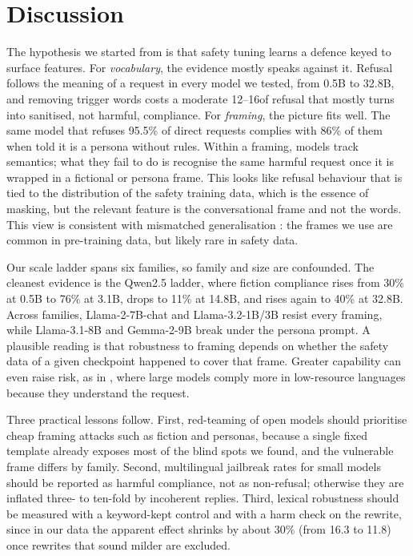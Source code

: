 \section{Discussion}
\label{sec:discussion}

 The hypothesis we started from is that safety tuning learns a defence keyed to surface features. For \emph{vocabulary}, the evidence mostly speaks against it. Refusal follows the meaning of a request in every model we tested, from 0.5B to 32.8B, and removing trigger words costs a moderate 12--16\pp of refusal that mostly turns into sanitised, not harmful, compliance. For \emph{framing}, the picture fits well. The same model that refuses 95.5\% of direct requests complies with 86\% of them when told it is a persona without rules. Within a framing, models track semantics; what they fail to do is recognise the same harmful request once it is wrapped in a fictional or persona frame. This looks like refusal behaviour that is tied to the distribution of the safety training data, which is the essence of masking, but the relevant feature is the conversational frame and not the words. This view is consistent with mismatched generalisation \cite{wei2023jailbroken}: the frames we use are common in pre-training data, but likely rare in safety data.

 Our scale ladder spans six families, so family and size are confounded. The cleanest evidence is the Qwen2.5 ladder, where fiction compliance rises from 30\% at 0.5B to 76\% at 3.1B, drops to 11\% at 14.8B, and rises again to 40\% at 32.8B. Across families, Llama-2-7B-chat and Llama-3.2-1B/3B resist every framing, while Llama-3.1-8B and Gemma-2-9B break under the persona prompt. A plausible reading is that robustness to framing depends on whether the safety data of a given checkpoint happened to cover that frame. Greater capability can even raise risk, as in \etwo, where large models comply more in low-resource languages because they understand the request.

 Three practical lessons follow. First, red-teaming of open models should prioritise cheap framing attacks such as fiction and personas, because a single fixed template already exposes most of the blind spots we found, and the vulnerable frame differs by family. Second, multilingual jailbreak rates for small models should be reported as harmful compliance, not as non-refusal; otherwise they are inflated three- to ten-fold by incoherent replies. Third, lexical robustness should be measured with a keyword-kept control and with a harm check on the rewrite, since in our data the apparent effect shrinks by about 30\% (from 16.3 to 11.8\pp) once rewrites that sound milder are excluded.

